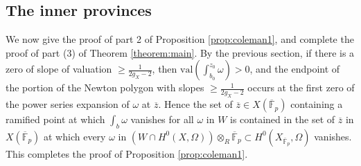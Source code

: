 \documentclass[11pt]{amsart}
\newcommand{\val}{\mathrm{val}}
\theoremstyle{plain}
\theoremstyle{definition}
\newcommand{\F}{\mathbb{F}}
\begin{document}
\subsection{The inner provinces}
We now give the proof of part 2 of Proposition \ref{prop:coleman1}, and complete the proof of part (3) of Theorem \ref{theorem:main}. 
By the previous section, if  there is a zero of slope of valuation $\geq \frac{1}{2g_X-2}$, then $\val (\int ^{z_0 }_{b_0 }\omega )>0$, and the endpoint of the portion of the Newton polygon with slopes $\geq \frac{1}{2g_X-2}$ occurs at the first zero of the power series expansion of $\omega $ at $\overline{z}$. Hence the set of $\overline{z}\in X(\overline{\F }_p )$ containing a ramified point at which $\int _b \omega $ vanishes for all $\omega $ in $W$ is contained in the set of $\overline{z}$ in $X(\overline{\F }_p )$ at which every $\omega $ in $(W\cap H^0 (X,\Omega ))\otimes _R \overline{\F }_p \subset H^0 (X_{\overline{\F }_p },\Omega )$ vanishes. This completes the proof of Proposition \ref{prop:coleman1}.
\end{document}
